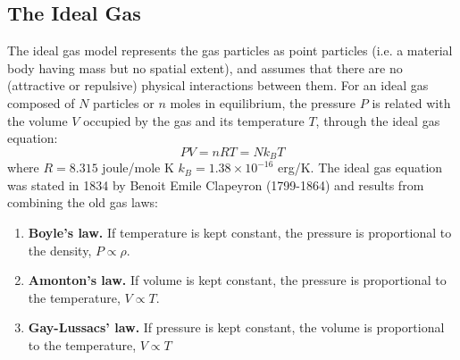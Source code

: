 \documentclass[../../../Main.tex]{subfiles}
\begin{document}
\subsection*{The Ideal Gas} 
The ideal gas model represents the gas particles as point particles (i.e. a material body having mass but no spatial extent), and assumes that there are no (attractive or repulsive) physical interactions between them. For an ideal gas composed of $N$ particles or $n$ moles in equilibrium, the pressure $P$ is related with the volume $V$ occupied by the gas and its temperature $T$, through the ideal gas equation:
\begin{equation*}
    P V = n RT = N k_B T
\end{equation*}
where $R=8.315$ joule/mole K $k_B = 1.38 \times 10^{-16}$ erg/K. The ideal gas equation was stated in 1834 by Benoit Emile Clapeyron (1799-1864) and results from combining the old gas laws: 
\begin{enumerate}
    \item \textbf{Boyle's law.} If temperature is kept constant, the pressure is proportional to the density, $P\propto \rho$. 
    \item \textbf{Amonton's law.} If volume is kept constant, the pressure is proportional to the temperature, $V\propto T$.
    \item \textbf{Gay-Lussacs' law.} If pressure is kept constant, the volume is proportional to the temperature, $V\propto T$
\end{enumerate}
\end{document}
